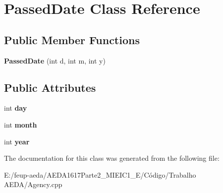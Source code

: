 \hypertarget{class_passed_date}{}\section{Passed\+Date Class Reference}
\label{class_passed_date}
\subsection*{Public Member Functions}
\begin{DoxyCompactItemize}
\item 
\mbox{\label{class_passed_date_aa2d8f7f8b8bdf1b1ba51d64b39ced632}} 
{\bfseries Passed\+Date} (int d, int m, int y)
\end{DoxyCompactItemize}
\subsection*{Public Attributes}
\begin{DoxyCompactItemize}
\item 
\mbox{\label{class_passed_date_a9d8af874932e7d9b3905740997bcb03d}} 
int {\bfseries day}
\item 
\mbox{\label{class_passed_date_a619002f7f79228fbf4bc26f28cd055a2}} 
int {\bfseries month}
\item 
\mbox{\label{class_passed_date_a0ca79bcf75538befd1543ccdeb8be9a5}} 
int {\bfseries year}
\end{DoxyCompactItemize}


The documentation for this class was generated from the following file\+:\begin{DoxyCompactItemize}
\item 
E\+:/feup-\/aeda/\+A\+E\+D\+A1617\+Parte2\+\_\+M\+I\+E\+I\+C1\+\_\+\+E/\+Código/\+Trabalho A\+E\+D\+A/Agency.\+cpp\end{DoxyCompactItemize}

